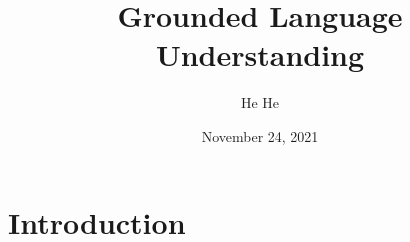 \documentclass[usenames,dvipsnames,11pt,aspectratio=169]{beamer}
\title[CSCI-GA.2590]{Grounded Language Understanding}
\author[He He]{He He
}
\institute[NYU]{New York University}
\date{November 24, 2021}
\begin{document}
\begin{frame}
\titlepage
\end{frame}


\section{Introduction}
\end{document}
